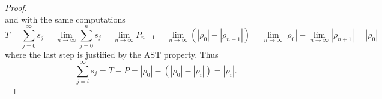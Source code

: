 \begin{LONG}
\begin{proof}
$$		$$
		and with the same computations
		$$
		T=\sum\limits_{j=0}^{\infty} s_j = \underset{n\rightarrow\infty}{\lim}\sum\limits_{j=0}^{n} s_j = \underset{n\rightarrow\infty}{\lim} P_{n+1} = \underset{n\rightarrow\infty}{\lim} (\left|\rho_0\right| -\left|\rho_{n+1}\right|) = \underset{n\rightarrow\infty}{\lim}|\rho_0|-\underset{n\rightarrow\infty}{\lim} |\rho_{n+1}| = \left|\rho_0\right|
		$$
		where the last step is justified by the AST property.
		Thus
		$$
		\sum\limits_{j=i}^{\infty} s_j = T - P = \left|\rho_0\right| - (\left|\rho_0\right| -\left|\rho_{i}\right|) = \left|\rho_{i}\right|.
		$$
	\end{proof}
\end{LONG}
